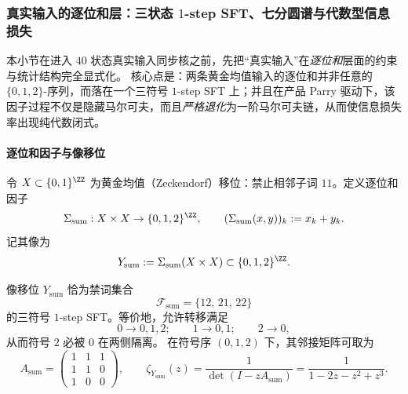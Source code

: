 \subsubsection{真实输入的逐位和层：三状态 \texorpdfstring{$1$}{1}-step SFT、七分圆谱与代数型信息损失}\label{app:real-input-digitwise-sum-layer}

本小节在进入 $40$ 状态真实输入同步核之前，先把“真实输入”在\emph{逐位和}层面的约束与统计结构完全显式化。
核心点是：两条黄金均值输入的逐位和并非任意的 $\{0,1,2\}$-序列，而落在一个三符号 $1$-step SFT 上；并且在产品 Parry 驱动下，该因子过程不仅是隐藏马尔可夫，而且\emph{严格退化}为一阶马尔可夫链，从而使信息损失率出现纯代数闭式。

\paragraph{逐位和因子与像移位}
令 $X\subset\{0,1\}^{\ZZ}$ 为黄金均值（Zeckendorf）移位：禁止相邻子词 $11$。定义逐位和因子
\[
\Sigma_{\mathrm{sum}}:X\times X\to\{0,1,2\}^{\ZZ},\qquad
(\Sigma_{\mathrm{sum}}(x,y))_k:=x_k+y_k.
\]
记其像为
\[
Y_{\mathrm{sum}}:=\Sigma_{\mathrm{sum}}(X\times X)\subset \{0,1,2\}^{\ZZ}.
\]

\begin{proposition}\label{prop:real-input-digitwise-sum-sft}
像移位 $Y_{\mathrm{sum}}$ 恰为禁词集合
\[
\mathcal{F}_{\mathrm{sum}}=\{12,\,21,\,22\}
\]
的三符号 $1$-step SFT。等价地，允许转移满足
\[
0\to 0,1,2;\qquad 1\to 0,1;\qquad 2\to 0,
\]
从而符号 $2$ 必被 $0$ 在两侧隔离。
在符号序 $(0,1,2)$ 下，其邻接矩阵可取为
\[
A_{\mathrm{sum}}=
\begin{pmatrix}
1&1&1\\
1&1&0\\
1&0&0
\end{pmatrix},
\qquad
\zeta_{Y_{\mathrm{sum}}}(z)=\frac{1}{\det(I-zA_{\mathrm{sum}})}=\frac{1}{1-2z-z^2+z^3}.
\]
\end{proposition}

